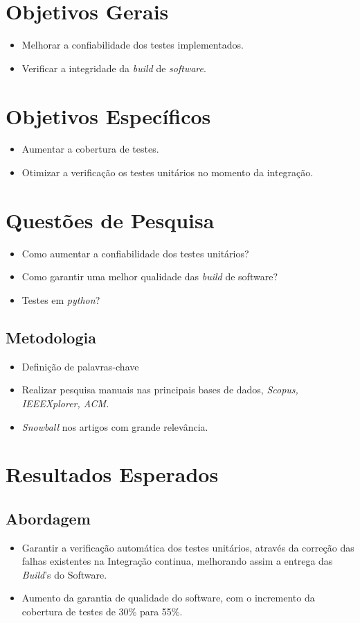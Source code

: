 \section{Objetivos Gerais}
\begin{itemize}
    \item Melhorar a confiabilidade dos testes implementados.
    \item Verificar a integridade da \textit{build} de \textit{software}.
\end{itemize}

\section{Objetivos Específicos }
\begin{itemize}
    \item Aumentar a cobertura de testes.
    \item Otimizar a verificação os testes unitários no momento da integração.
\end{itemize}

\section{Questões de Pesquisa}
\begin{itemize}
    \item Como aumentar a confiabilidade dos testes unitários?
    \item Como garantir uma melhor qualidade das \textit{build} de software?
    \item Testes em \textit{python}?
\end{itemize}

\subsection{Metodologia}
\begin{itemize}
    \item Definição de palavras-chave
    \item Realizar pesquisa manuais nas principais bases de dados,\textit{ Scopus, IEEEXplorer, ACM.}
    \item \textit{Snowball} nos artigos com grande relevância.
\end{itemize}

\section{Resultados Esperados}
\subsection{Abordagem}
\begin{itemize}
    \item Garantir a verificação automática dos testes unitários, através da correção das falhas existentes na Integração continua, melhorando assim a entrega das \textit{Build}'s do Software.  
    \item Aumento da garantia de qualidade do software, com o incremento da cobertura de testes de 30\% para 55\%.
\end{itemize}


